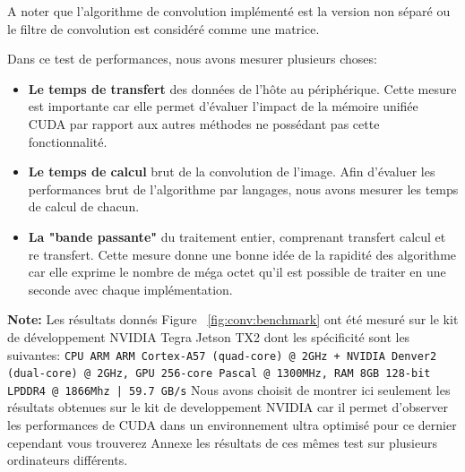 A noter que l'algorithme de convolution implémenté est la version non séparé ou le filtre de convolution est considéré comme une matrice.

Dans ce test de performances, nous avons mesurer plusieurs choses:
\begin{itemize}
\item \textbf{Le temps de transfert} des données de l'hôte au périphérique. Cette mesure est importante car elle permet d'évaluer l'impact de la mémoire unifiée CUDA par rapport aux autres méthodes ne possédant pas cette fonctionnalité.
\item \textbf{Le temps de calcul} brut de la convolution de l'image. Afin d'évaluer les performances brut de l'algorithme par langages, nous avons mesurer les temps de calcul de chacun.
\item \textbf{La "bande passante"} du traitement entier, comprenant transfert calcul et re transfert. Cette mesure donne une bonne idée de la rapidité des algorithme car elle exprime le nombre de méga octet qu'il est possible de traiter en une seconde avec chaque implémentation.
\end{itemize}

\textbf{Note:} Les résultats donnés Figure ~\ref{fig:conv:benchmark} ont été mesuré sur le kit de développement NVIDIA Tegra Jetson TX2 dont les spécificité sont les suivantes: \texttt{CPU ARM ARM Cortex-A57 (quad-core) @ 2GHz + NVIDIA Denver2 (dual-core) @ 2GHz, GPU 256-core Pascal @ 1300MHz, RAM 8GB 128-bit LPDDR4 @ 1866Mhz |  59.7 GB/s} Nous avons choisit de montrer ici seulement les résultats obtenues sur le kit de developpement NVIDIA car il permet d'observer les performances de CUDA dans un environnement ultra optimisé pour ce dernier cependant vous trouverez Annexe %
les résultats de ces mêmes test sur plusieurs ordinateurs différents.

